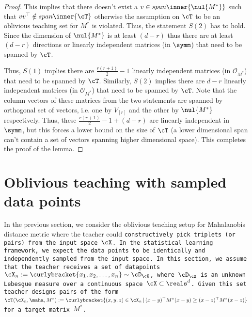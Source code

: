 \begin{proof}
    This implies that there doesn't exist a $v \in span \inner{\nul{M^*}}$ such that $vv^{\top} \notin span \inner{\cT}$ otherwise the assumption on $\cT$ to be an oblivious teaching set for $M^*$ is violated. Thus, the statement $S(2)$ has to hold. Since the dimension of $\nul{M^*}$ is at least $(d-r)$ thus there are at least $(d-r)$ directions or linearly independent matrices (in $\symm$) that need to be spanned by $\cT$.

    Thus, $S(1)$ implies there are $\frac{r(r+1)}{2} -1$ linearly independent matrices (in $\mathcal{O}_{M^*}$) that need to be spanned by $\cT$. Similarly, $S(2)$ implies there are $d-r$ linearly independent matrices (in $\mathcal{O}_{M^*}$) that need to be spanned by $\cT$. Note that the column vectors of these matrices from the two statements are spanned by orthogonal set of vectors, i.e. one by $V_{[r]}$ and the other by $\nul{M^*}$ respectively. Thus, these $\frac{r(r+1)}{2} -1 + (d-r)$ are linearly independent in $\symm$, but this forces a lower bound on the size of $\cT$ (a lower dimensional span can't contain a set of vectors spanning higher dimensional space). This completes the proof of the lemma.
\end{proof}



\section{Oblivious teaching with sampled data points}
In the previous section, we consider the oblivious teaching setup for Mahalanobis distance metric where the teacher could \tt{constructively} pick triplets (or pairs) from the input space $\cX$. In the statistical learning framework, we expect the data points to be identically and independently sampled from the input space. In this section, we assume that the teacher receives a set of datapoints $\cX_n := \curlybracket{x_1,x_2,\ldots,x_n} \sim \cD_{\cX}$, where $\cD_{\cX}$ is an unknown Lebesgue measure over a continuous space $\cX \subset \reals^d$. Given this set teacher designs pairs of the form $\cT(\cX_n, \maha, M^*) := \curlybracket{(x,y,z) \in \cX_n \,|\, (x-y)^{\top}M^*(x-y) \ge (x-z)^{\top}M^*(x-z)}$ for a target matrix $M^*$.

